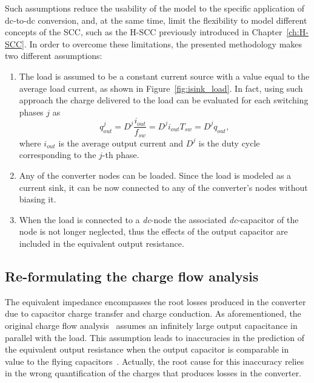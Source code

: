 Such assumptions reduce the usability of the model to the specific application of dc-to-dc conversion, and, at the same time, limit the flexibility to model different concepts of the SCC, such as the H-SCC previously introduced in Chapter~\ref{ch:H-SCC}. In order to overcome these limitations, the presented methodology makes two different assumptions:
\begin{enumerate}
  \item The load is assumed to be a constant current source with a value equal to the average load current, as shown in Figure~\ref{fig:isink_load}. In fact, using such approach the charge delivered to the load can be evaluated for each switching phases $j$ as
      \begin{equation}
        q_{out}^j = D^j \frac{i_{out}}{f_{sw}} = D^j i_{out}{T_{sw}}  = D^j q_{out},
      \label{eq:q_out}
      \end{equation}
  where $i_{out}$ is the average output current and $D^j$ is the duty cycle corresponding to the $j$-th phase.


  \item Any of the converter nodes can be loaded. Since the load is modeled as a current sink, it can be now connected to any of the converter's nodes without biasing it.

  \item When the load is connected to a \emph{dc}-node the associated \emph{dc}-capacitor of the node is not longer neglected, thus the effects of the output capacitor are included in the equivalent output resistance.

\end{enumerate}


\subsection{Re-formulating the charge flow analysis}

The equivalent impedance encompasses the root losses produced in the converter due to capacitor charge transfer and charge conduction. As aforementioned, the original charge flow analysis~\cite{95Makowski} assumes an infinitely large output capacitance in parallel with the load. This assumption leads to inaccuracies in the prediction of the equivalent output resistance when the output capacitor is comparable in value to the flying capacitors~\cite{2013Breussegem:c_out}. Actually, the root cause for this inaccuracy relies in the wrong quantification of the charges that produces losses in the converter.\\


